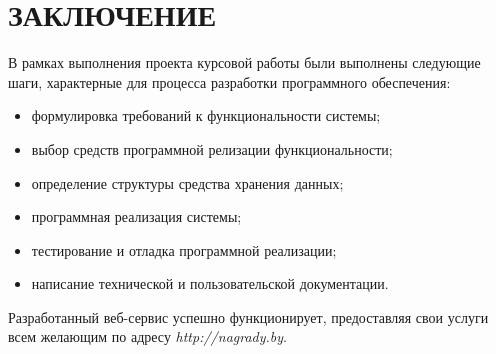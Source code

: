 \section*{ЗАКЛЮЧЕНИЕ}

В рамках выполнения проекта курсовой работы были выполнены
следующие шаги, характерные для процесса разработки 
программного обеспечения:

\begin{itemize}
\item формулировка требований к функциональности системы;
\item выбор средств программной релизации функциональности;
\item определение структуры средства хранения данных;
\item программная реализация системы;
\item тестирование и отладка программной реализации;
\item написание технической и пользовательской документации.
\end{itemize}

Разработанный веб-сервис успешно функционирует, предоставляя
свои услуги всем желающим по адресу \textit{http://nagrady.by}.
